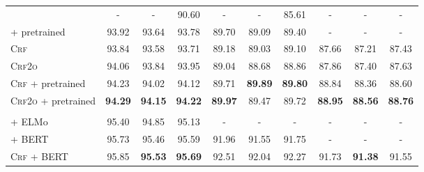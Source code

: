 \begin{table*}[tb]
\begin{tabularx}{\textwidth}{lccccccccc}
    \citet{vilares-etal-2019-better}                 & -                        & -                          & 90.60                    & -                        & -                        & 85.61                    & -              & -              & -              \\
    \citet{zhou-zhao-2019-head} + pretrained         & 93.92                    & 93.64                      & 93.78                    & 89.70                    & 89.09                    & 89.40                    & -              & -              & -              \\[3pt]
    \textsc{Crf}                                     & 93.84                    & 93.58                      & 93.71                    & 89.18                    & 89.03                    & 89.10                    & 87.66          & 87.21          & 87.43          \\
    \textsc{Crf2o}                                   & 94.06                    & 93.84                      & 93.95                    & 89.04                    & 88.68                    & 88.86                    & 87.86          & 87.40          & 87.63          \\
    \textsc{Crf} + pretrained                        & 94.23                    & 94.02                      & 94.12                    & 89.71                    & \textbf{89.89}           & \textbf{89.80}           & 88.84          & 88.36          & 88.60          \\
    \textsc{Crf2o} + pretrained                      & \textbf{94.29}           & \textbf{94.15}             & \textbf{94.22}           & \textbf{89.97}           & 89.47                    & 89.72                    & \textbf{88.95} & \textbf{88.56} & \textbf{88.76} \\[1pt]
    \midrule
    \\[-20pt]
    \citet{kitaev-klein-2018-constituency} + ELMo    & 95.40                    & 94.85                      & 95.13                    & -                        & -                        & -                        & -              & -              & -              \\
    \citet{kitaev-etal-2019-multilingual} + BERT     & 95.73                    & 95.46                      & 95.59                    & 91.96                    & 91.55                    & 91.75                    & -              & -              & -              \\[3pt]
    \textsc{Crf} + BERT                              & 95.85                    & \textbf{95.53}             & \textbf{95.69}           & 92.51                    & 92.04                    & 92.27                    & 91.73          & \textbf{91.38} & 91.55          \\

\end{tabularx}
\end{table*}
